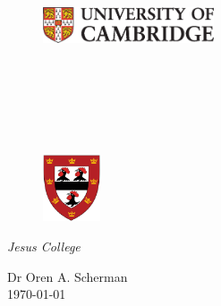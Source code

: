 \begin{titlepage}

    \begin{figure}[h]
        \begin{flushright}
            \includegraphics[width=0.45\textwidth]{CUnibig.eps}
        \end{flushright}
    \end{figure}
    \begin{flushright}
         \\
         \\
         \\
    \end{flushright}

    \vspace*{0.5cm}
    \begin{center}
        \Huge\@title
    \end{center}
    \vspace{0.75cm}
    \begin{center}
        \Large\@author \\[3pt]
    \end{center}

    \begin{figure}[h]
        \begin{center}
            \includegraphics[width=0.15\textwidth]{jesus.eps}
        \end{center}
    \end{figure}

    \vspace{-1.2cm}
    \begin{center}
        \Large {\it Jesus College}\\
    \end{center}

    \vspace{0.25cm}
    \begin{center}
        \Large {Dr Oren A. Scherman}\\
        \today
    \end{center}


\end{titlepage}
